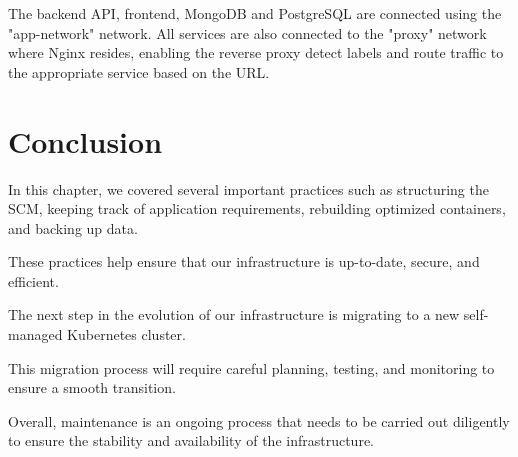 The backend API, frontend, MongoDB and PostgreSQL are connected using the "app-network" network. All services are also connected to the "proxy" network where Nginx resides, enabling the reverse proxy detect labels and route traffic to the appropriate service based on the URL. 

\section*{Conclusion}
In this chapter, we covered several important practices such as structuring the SCM, keeping track of application requirements, rebuilding optimized containers, and backing up data. 

These practices help ensure that our infrastructure is up-to-date, secure, and efficient.  

The next step in the evolution of our infrastructure is migrating to a new self-managed Kubernetes cluster. 

This migration process will require careful planning, testing, and monitoring to ensure a smooth transition. 

Overall, maintenance is an ongoing process that needs to be carried out diligently to ensure the stability and availability of the infrastructure.

